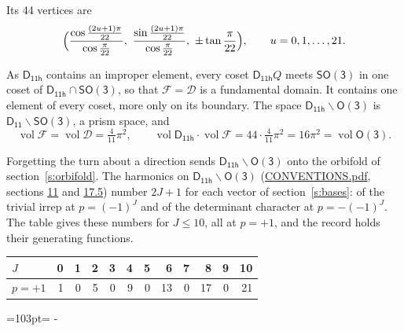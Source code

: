 \documentclass[10pt,a4paper]{article}
\newcommand{\needspace}[1]{\par\penalty-100\begingroup\dimen0=#1\relax\dimen2=\pagegoal
  \advance\dimen2-\pagetotal\ifdim\dimen0>\dimen2\relax\ifdim\dimen2>0pt\vfil\break\fi\fi
  \endgroup}
\numberwithin{equation}{section}
\newcommand{\grp}[1]{\mathsf{#1}}
\newcommand{\vol}{\operatorname{vol}}
\newcommand{\fcell}{\mathcal{D}}
\newcommand{\fdomain}{\mathcal{F}}
\begin{document}
\leavevmode\label{n:local.vertex.u}Its 44 vertices are
\begin{equation}\label{e:prism}\Bigl(\frac{\cos\frac{(2u+1)\pi}{22}}{\cos\frac{\pi}{22}},\ \frac{\sin\frac{(2u+1)\pi}{22}}{\cos\frac{\pi}{22}},\ \pm\tan\frac{\pi}{22}\Bigr),\qquad u = 0, 1, \dots, 21.\end{equation}

\leavevmode\label{n:set.fundamental}As $\grp{D_{11h}}$ contains an improper element, every coset $\grp{D_{11h}}Q$ meets \href{SO3.pdf}{$\grp{SO(3)}$} in one coset of $\grp{D_{11h}} \cap \grp{SO(3)}$, so that $\fdomain = \fcell$ is a fundamental domain. It contains one element of every coset, more only on its boundary.
The space $\grp{D_{11h}}\backslash\grp{O(3)}$ is $\grp{D_{11}}\backslash\grp{SO(3)}$, a prism space, and
\begin{equation}\label{e:volume}\vol\fdomain = \vol\fcell = \tfrac{4}{11}\pi^2,\qquad \vol\grp{D_{11h}}\cdot\vol\fdomain = 44\cdot \tfrac{4}{11}\pi^2 = 16\pi^2 = \vol\grp{O(3)}.\end{equation}

Forgetting the turn about a direction sends $\grp{D_{11h}}\backslash\grp{O(3)}$ onto the orbifold of section~\ref{s:orbifold}.
The harmonics on $\grp{D_{11h}}\backslash\grp{O(3)}$ (\href{../../CONVENTIONS.pdf}{CONVENTIONS.pdf}, sections \href{../../CONVENTIONS.pdf\#conv.11}{11} and \href{../../CONVENTIONS.pdf\#conv.17.5}{17.5}) number $2J + 1$ for each vector of section~\ref{s:bases}: of the trivial irrep at $p = (-1)^J$ and of the determinant character at $p = -(-1)^J$. The table gives these numbers for $J \le 10$, all at $p = +1$, and the record holds their generating functions.
{\small\setlength{\tabcolsep}{4pt}\begin{longtable}{@{}lrrrrrrrrrrr@{}}\toprule
$J$ & 0 & 1 & 2 & 3 & 4 & 5 & 6 & 7 & 8 & 9 & 10\\\midrule\endhead
\bottomrule\endfoot\endlastfoot
$p = +1$ & 1 & 0 & 5 & 0 & 9 & 0 & 13 & 0 & 17 & 0 & 21\\
\bottomrule\end{longtable}}
\needspace{103pt}
\end{document}
